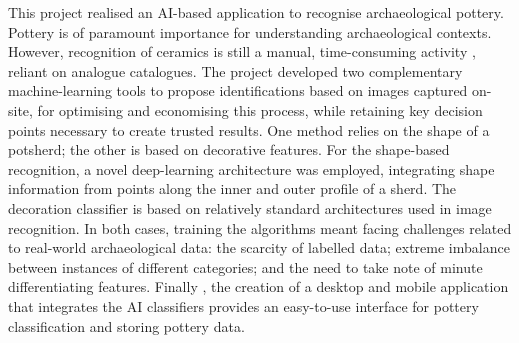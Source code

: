 \documentclass[journal]{IEEEtran}
\begin{document}
\begin{itemize}
		  This project  realised an AI-based application to recognise archaeological pottery.
		  Pottery is of paramount importance for understanding archaeological contexts. However, recognition of
		  ceramics is still a manual, time-consuming activity , reliant on analogue catalogues. The project
		  developed two complementary machine-learning tools to propose identifications based on images
		  captured on-site, for optimising and economising this process, while retaining key decision points
		  necessary to create trusted results. One method relies on the shape of a potsherd; the other is based
		  on decorative features. For the shape-based recognition, a novel deep-learning architecture was
		  employed, integrating shape information from points along the inner and outer profile of a sherd.
		  The decoration classifier is based on relatively standard architectures used in image recognition. In
		  both cases, training the algorithms meant facing challenges related to real-world archaeological data:
		  the scarcity of labelled data; extreme imbalance between instances of different categories; and the
		  need to take note of minute differentiating features. Finally , the creation of a desktop and mobile
		  application that integrates the AI classifiers provides an easy-to-use interface for pottery classification
		  and storing pottery data.
		  

\end{itemize}
\end{document}
